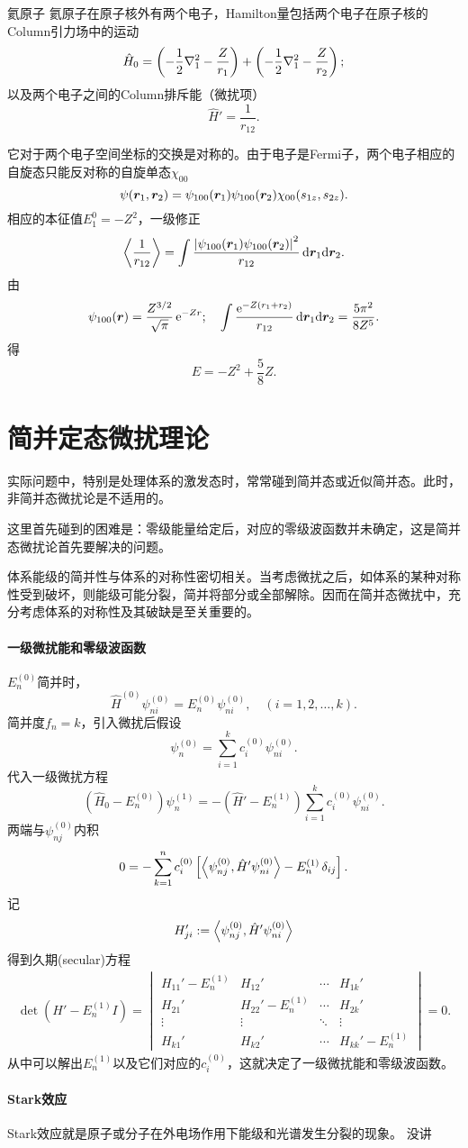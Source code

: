 \begin{example}{氦原子}{}
	氦原子在原子核外有两个电子，Hamilton量包括两个电子在原子核的Column引力场中的运动
	\[
		\hat H_0=\left(-\frac12\nabla_1^2-\frac Z{r_1}\right)+\left(-\frac12\nabla_1^2-\frac Z{r_2}\right);
\]
	以及两个电子之间的Column排斥能（微扰项）
	\[
		\hat H'=\frac1{r_{12}}.
\]

	它对于两个电子空间坐标的交换是对称的。由于电子是Fermi子，两个电子相应的自旋态只能反对称的自旋单态$\chi_{00}$
	\[
		\psi(\bm r_1,\bm r_2)=\psi_{100}(\bm r_1)\psi_{100}(\bm r_2)\chi_{00}(s_{1z},s_{2z}).
\]
	相应的本征值$E_1^0=-Z^2$，一级修正
	\[
		\left\langle \frac1{r_{12}}\right\rangle=\int\frac{\left\lvert\psi_{100}(\bm r_1)\psi_{100}(\bm r_2)\right\rvert^2}{r_{12}}\mathop{}\!\mathrm{d}\bm r_1\mathrm{d}\bm r_2.
\]
	由
	\[
		\psi_{100}(\bm r)=\frac{Z^{3/2}}{\sqrt\pi}\mathop{}\!\mathrm{e}^{-Zr};\quad \int\frac{\mathop{}\!\mathrm{e}^{-Z(r_1+r_2)}}{r_{12}}\mathop{}\!\mathrm{d}\bm r_1\mathrm{d}\bm r_2=\frac{5\pi^2}{8Z^5}.
\]
	得
	\[
E=-Z^2+\frac58Z.
\]
\end{example}
\section{简并定态微扰理论}
实际问题中，特别是处理体系的激发态时，常常碰到简并态或近似简并态。此时，非简并态微扰论是不适用的。

这里首先碰到的困难是：零级能量给定后，对应的零级波函数并未确定，这是简并态微扰论首先要解决的问题。

体系能级的简并性与体系的对称性密切相关。当考虑微扰之后，如体系的某种对称性受到破坏，则能级可能分裂，简并将部分或全部解除。因而在简并态微扰中，充分考虑体系的对称性及其破缺是至关重要的。
\paragraph{一级微扰能和零级波函数}$E_n^{(0)}$简并时，
\[
	\hat H^{(0)}\psi_{ni}^{(0)}=E_n^{(0)}\psi_{ni}^{(0)},\quad (i=1,2,\ldots,k).
\]
简并度$f_n=k$，引入微扰后假设
\[
	\psi_n^{(0)}=\sum_{i=1}^kc_i^{(0)}\psi_{ni}^{(0)}.
\]
代入一级微扰方程
\[
	(\hat H_0-E_n^{(0)})\psi_n^{(1)}=-(\hat H'-E_n^{(1)})\sum_{i=1}^kc_i^{(0)}\psi_{ni}^{(0)}.
\]
两端与$\psi_{nj}^{(0)}$内积
\[
0=-\sum_{k=1}^nc_i^{(0)}\left[\left\langle \psi_{nj}^{(0)},\hat H'\psi_{ni}^{(0)}\right\rangle-E_n^{(1)}\mathop{}\!\delta_{ij}\right].
\]
记
\begin{align}
	H_{ji}':=\left\langle \psi_{nj}^{(0)},\hat H'\psi_{ni}^{(0)}\right\rangle
\end{align}
得到久期(secular)方程
\begin{align}
	\det(H'-E_n^{(1)}I)=\begin{vmatrix}
		H_{11}'-E_n^{(1)}&H_{12}'&\cdots&H_{1k}'\\
		H_{21}'&H_{22}'-E_n^{(1)}&\cdots&H_{2k}'\\
		\vdots&\vdots&\ddots&\vdots\\
		H_{k1}'&H_{k2}'&\cdots&H_{kk}'-E_n^{(1)}
	\end{vmatrix}=0.
\end{align}
从中可以解出$E_n^{(1)}$以及它们对应的$c_i^{(0)}$，这就决定了一级微扰能和零级波函数。
\paragraph{Stark效应}Stark效应就是原子或分子在外电场作用下能级和光谱发生分裂的现象。
没讲